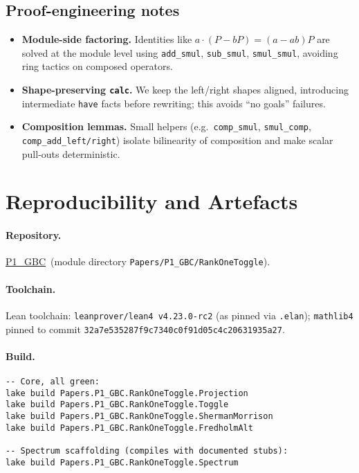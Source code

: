 \documentclass[11pt]{article}
\theoremstyle{definition}
\newcommand{\leanRepoTag}{\href{https://github.com/AICardiologist/FoundationRelativity/tree/main/Papers/P1_GBC}{P1\_GBC}}
\begin{document}
\subsection*{Proof-engineering notes}
\begin{itemize}
\item \textbf{Module-side factoring.} Identities like $a\cdot(P-bP)=(a-ab)P$ are solved at the module level using \texttt{add\_smul}, \texttt{sub\_smul}, \texttt{smul\_smul}, avoiding ring tactics on composed operators.
\item \textbf{Shape-preserving \texttt{calc}.} We keep the left/right shapes aligned, introducing intermediate \texttt{have} facts before rewriting; this avoids ``no goals'' failures.
\item \textbf{Composition lemmas.} Small helpers (e.g.\ \texttt{comp\_smul}, \texttt{smul\_comp}, \texttt{comp\_add\_left/right}) isolate bilinearity of composition and make scalar pull-outs deterministic.
\end{itemize}

\section{Reproducibility and Artefacts}\label{sec:artefacts}

\paragraph{Repository.} \leanRepoTag\ (module directory \texttt{Papers/P1\_GBC/RankOneToggle}).

\paragraph{Toolchain.} Lean toolchain: \texttt{leanprover/lean4 v4.23.0-rc2} (as pinned via \texttt{.elan}); \texttt{mathlib4} pinned to commit \texttt{32a7e535287f9c7340c0f91d05c4c20631935a27}.

\paragraph{Build.}
\begin{verbatim}
-- Core, all green:
lake build Papers.P1_GBC.RankOneToggle.Projection
lake build Papers.P1_GBC.RankOneToggle.Toggle
lake build Papers.P1_GBC.RankOneToggle.ShermanMorrison
lake build Papers.P1_GBC.RankOneToggle.FredholmAlt

-- Spectrum scaffolding (compiles with documented stubs):
lake build Papers.P1_GBC.RankOneToggle.Spectrum
\end{verbatim}
\end{document}
